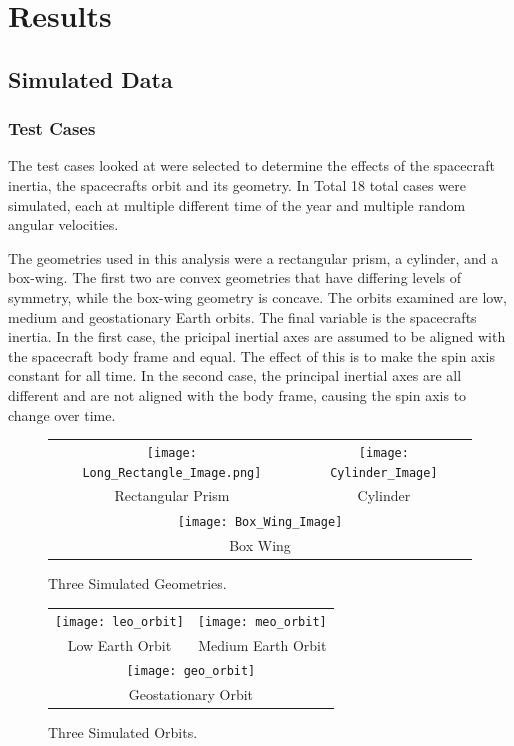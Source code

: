 \chapter{Results}

\section{Simulated Data}

\subsection{Test Cases}

The test cases looked at were selected to determine the effects of the spacecraft inertia, the spacecrafts orbit and its geometry. In Total 18 total cases were simulated, each at multiple different time of the year and multiple random angular velocities.

The geometries used in this analysis were a rectangular prism, a cylinder, and a box-wing. The first two are convex geometries that have differing levels of symmetry, while the box-wing geometry is concave. The orbits examined are low, medium and geostationary Earth orbits. The final variable is the spacecrafts inertia. In the first case, the pricipal inertial axes are assumed to be aligned with the spacecraft body frame and equal. The effect of this is to make the spin axis constant for all time. In the second case, the principal inertial axes are all different and are not aligned with the body frame, causing the spin axis to change over time.

\begin{figure}\label{simulated_geometries}
	\begin{tabular}{cc}
		\texttt{[image: Long\_Rectangle\_Image.png]} &
		\texttt{[image: Cylinder\_Image]} \\
		Rectangular Prism & Cylinder \\
		\multicolumn{2}{c}{\texttt{[image: Box\_Wing\_Image]}} \\
		\multicolumn{2}{c}{Box Wing}
	\end{tabular}
	\caption{Three Simulated Geometries.}
\end{figure}


\begin{figure}
	\begin{tabular}{cc}
		\texttt{[image: leo\_orbit]} &
		\texttt{[image: meo\_orbit]} \\
		Low Earth Orbit & Medium Earth Orbit \\
		\multicolumn{2}{c}{\texttt{[image: geo\_orbit]}} \\
		\multicolumn{2}{c}{Geostationary Orbit}
	\end{tabular}
	\caption{Three Simulated Orbits.}
\end{figure}

